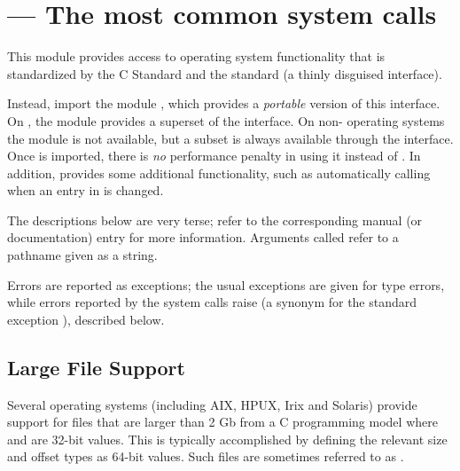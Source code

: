 \section{ ---
         The most common \POSIX{} system calls}



This module provides access to operating system functionality that is
standardized by the C Standard and the \POSIX{} standard (a thinly
disguised \UNIX{} interface).

  Instead, import the
module , which provides a \emph{portable} version of this
interface.  On \UNIX{}, the  module provides a superset of
the  interface.  On non-\UNIX{} operating systems the
 module is not available, but a subset is always
available through the  interface.  Once  is
imported, there is \emph{no} performance penalty in using it instead
of .  In addition, 
provides some additional functionality, such as automatically calling
 when an entry in  is changed.

The descriptions below are very terse; refer to the corresponding
\UNIX{} manual (or \POSIX{} documentation) entry for more information.
Arguments called  refer to a pathname given as a string.

Errors are reported as exceptions; the usual exceptions are given for
type errors, while errors reported by the system calls raise
 (a synonym for the standard exception
), described below.


\subsection{Large File Support \label{posix-large-files}}


Several operating systems (including AIX, HPUX, Irix and Solaris)
provide support for files that are larger than 2 Gb from a C
programming model where  and  are 32-bit
values. This is typically accomplished by defining the relevant size
and offset types as 64-bit values. Such files are sometimes referred
to as .

